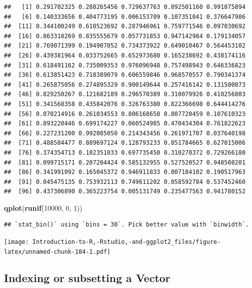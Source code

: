 \documentclass[]{book}
\newenvironment{Shaded}{\begin{snugshade}}{\end{snugshade}}
\newcommand{\KeywordTok}[1]{\textcolor[rgb]{0.13,0.29,0.53}{\textbf{{#1}}}}
\newcommand{\DecValTok}[1]{\textcolor[rgb]{0.00,0.00,0.81}{{#1}}}
\newcommand{\NormalTok}[1]{{#1}}
\begin{document}
\begin{verbatim}
##   [1] 0.291702325 0.288265456 0.729637763 0.892501160 0.991075894
##   [6] 0.140333656 0.404773195 0.006153709 0.107351041 0.376647986
##  [11] 0.344100249 0.610523692 0.287946961 0.759771546 0.097030692
##  [16] 0.863318269 0.835555679 0.057731853 0.947142984 0.179134057
##  [21] 0.769071399 0.194907052 0.734373922 0.649010467 0.564453102
##  [26] 0.439381964 0.033752665 0.652973680 0.165238692 0.438174116
##  [31] 0.618491162 0.735009353 0.976096948 0.757498943 0.646336823
##  [36] 0.613851423 0.718389079 0.606559846 0.968570557 0.790341374
##  [41] 0.265875056 0.274895329 0.900149644 0.257416142 0.131500073
##  [46] 0.829250267 0.121682189 0.296570389 0.310079926 0.410256803
##  [51] 0.341568358 0.435842076 0.326763380 0.822366698 0.644414276
##  [56] 0.070214916 0.261034553 0.806168658 0.807720459 0.107610323
##  [61] 0.893220446 0.699174227 0.060524985 0.470434304 0.761822623
##  [66] 0.227231200 0.992085050 0.214343456 0.261971707 0.037640198
##  [71] 0.488584477 0.889697124 0.128793233 0.851784665 0.627015006
##  [76] 0.374354713 0.102351033 0.697735450 0.310270372 0.729266180
##  [81] 0.099715171 0.207204424 0.585132955 0.527520527 0.940508201
##  [86] 0.341991092 0.165045372 0.946911833 0.007184102 0.190517963
##  [91] 0.045475135 0.753932113 0.749611202 0.058592784 0.537452460
##  [96] 0.437306890 0.365223754 0.005131749 0.235477563 0.941780152
\end{verbatim}

\begin{Shaded}
\begin{Highlighting}[]
\KeywordTok{qplot}\NormalTok{(}\KeywordTok{runif}\NormalTok{(}\DecValTok{10000}\NormalTok{, }\DecValTok{0}\NormalTok{, }\DecValTok{1}\NormalTok{))}
\end{Highlighting}
\end{Shaded}

\begin{verbatim}
## `stat_bin()` using `bins = 30`. Pick better value with `binwidth`.
\end{verbatim}

\texttt{[image: Introduction-to-R,-Rstudio,-and-ggplot2\_files/figure-latex/unnamed-chunk-104-1.pdf]}

\subsection{Indexing or subsetting a
Vector}\label{indexing-or-subsetting-a-vector}
\end{document}
